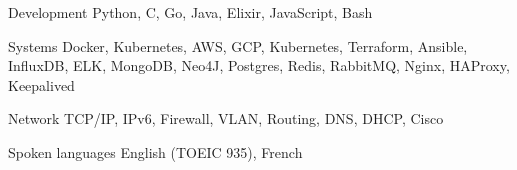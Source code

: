 


\begin{cvskills}


\cvskill
{Development} %
{Python, C, Go, Java, Elixir, JavaScript, Bash} %




\cvskill
{Systems} %
{Docker, Kubernetes, AWS, GCP, Kubernetes, Terraform, Ansible, InfluxDB,\break
ELK, MongoDB, Neo4J, Postgres, Redis, RabbitMQ, Nginx, HAProxy, Keepalived} %



\cvskill
{Network} %
{TCP/IP, IPv6, Firewall, VLAN, Routing, DNS, DHCP, Cisco} %





\cvskill
{Spoken languages} %
{English (TOEIC 935), French} %


\end{cvskills}